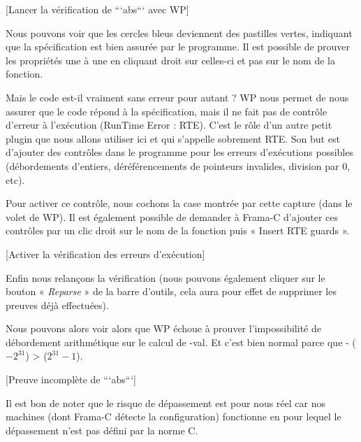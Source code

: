 \documentclass[middle]{zmdocument}
\begin{document}
[Lancer la vérification de ```abs``` avec WP]


Nous pouvons voir que les cercles bleus deviennent des pastilles vertes, 
indiquant que la spécification est bien assurée par le programme. Il est 
possible de prouver les propriétés une à une en cliquant droit sur celles-ci 
et pas sur le nom de la fonction.



Mais le code est-il vraiment sans erreur pour autant ? WP nous permet de nous 
assurer que le code répond à la spécification, mais il ne fait pas de contrôle 
d'erreur à l'exécution (RunTime Error : RTE). C'est le rôle d'un autre petit 
plugin que nous allons utiliser ici et qui s'appelle sobrement RTE. Son but est
d'ajouter des contrôles dans le programme pour les erreurs d'exécutions 
possibles (débordements d'entiers, déréférencements de pointeurs invalides, 
division par 0, etc).



Pour activer ce contrôle, nous cochons la case montrée par cette capture (dans 
le volet de WP). Il est également possible de demander à Frama-C d'ajouter ces 
contrôles par un clic droit sur le nom de la fonction puis « Insert RTE guards ».



[Activer la vérification des erreurs d'exécution]


Enfin nous relançons la vérification (nous pouvons également cliquer sur le 
bouton « \textit{Reparse} » de la barre d'outils, cela aura pour effet de supprimer les
preuves déjà effectuées).



Nous pouvons alors voir alors que WP échoue à prouver  l'impossibilité de 
débordement arithmétique sur le calcul de -val. Et c'est bien normal parce 
que - ($-2^{31}$) >  ($2^{31}-1$).



[Preuve incomplète de ```abs```]


\begin{Information}
Il est bon de noter que le risque de dépassement est pour nous réel car nos
machines (dont Frama-C détecte la configuration) fonctionne en 
pour lequel le dépassement n'est pas défini par la norme C.
\end{Information}
\end{document}
